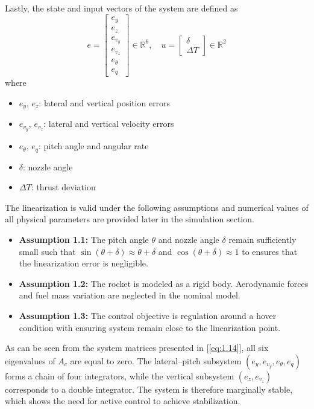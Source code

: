 \documentclass[10pt,twocolumn,twoside]{IEEEtran}
\begin{document}
Lastly, the state and input vectors of the system are defined as
\begin{equation}
    e =
    \begin{bmatrix}
    e_y \\ e_z \\ e_{v_y} \\ e_{v_z} \\ e_{\theta} \\ e_q
    \end{bmatrix} \in \mathbb{R}^6, \quad
    u =
    \begin{bmatrix}
    \delta \\ \Delta T
    \end{bmatrix} \in \mathbb{R}^2
    \label{eq:1.14}
\end{equation}
where
\begin{itemize}
    \item $e_y,\, e_z$: lateral and vertical position errors
    \item $e_{v_y},\, e_{v_z}$: lateral and vertical velocity errors
    \item $e_{\theta},\, e_q$: pitch angle and angular rate
    \item $\delta$: nozzle angle
    \item $\Delta T$: thrust deviation
\end{itemize}

The linearization is valid under the following assumptions and numerical values of all physical parameters are provided later in the simulation section.
\begin{itemize}
    \item \textbf{Assumption 1.1:} The pitch angle $\theta$ and nozzle angle $\delta$ remain sufficiently small such that $\sin(\theta+\delta) \approx \theta+\delta$ and $\cos(\theta+\delta) \approx 1$ to ensures that the linearization error is negligible.

    \item \textbf{Assumption 1.2:} The rocket is modeled as a rigid body. Aerodynamic forces and fuel mass variation are neglected in the nominal model.

    \item \textbf{Assumption 1.3:} The control objective is regulation around a hover condition with ensuring system remain close to the linearization point.
\end{itemize}

As can be seen from the system matrices presented in [\ref{eq:1.14}], all six eigenvalues of $A_c$ are equal to zero. The lateral--pitch subsystem $(e_y, e_{v_y}, e_{\theta}, e_q)$ forms a chain of four integrators, while the vertical subsystem $(e_z, e_{v_z})$ corresponds to a double integrator. The system is therefore marginally stable, which shows the need for active control to achieve stabilization.
\end{document}
